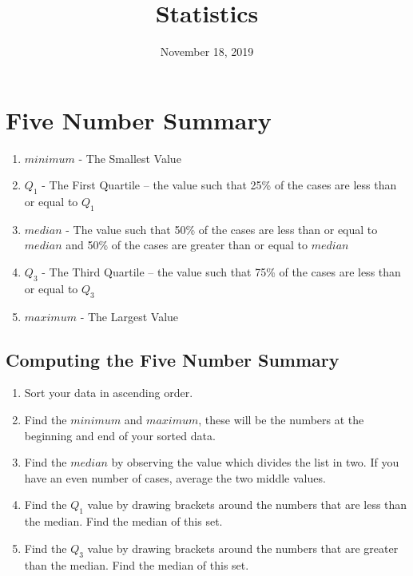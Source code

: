 \documentclass{article}
\title{Statistics}
\date{November 18, 2019}
\begin{document}
\maketitle

\section{Five Number Summary}
\begin{enumerate}
    \item $minimum$ - The Smallest Value
    \item $Q_1$ - The First Quartile -- the value such that 25\% of the cases are less than
        or equal to $Q_1$
    \item $median$ - The value such that 50\% of the cases are less
        than or equal to $median$ and 50\% of the cases are greater than
        or equal to $median$
    \item $Q_3$ - The Third Quartile -- the value such that 75\% of the cases are less than
        or equal to $Q_3$
    \item $maximum$ - The Largest Value
\end{enumerate}

\subsection{Computing the Five Number Summary}
\begin{enumerate}
    \item Sort your data in ascending order.
    \item Find the $minimum$ and $maximum$, these will be the numbers
        at the beginning and end of your sorted data.
    \item Find the $median$ by observing the value which divides the
        list in two.  If you have an even number of cases, average the
        two middle values.
    \item Find the $Q_1$ value by drawing brackets around the numbers
        that are less than the median.  Find the median of this set.
    \item Find the $Q_3$ value by drawing brackets around the numbers
        that are greater than the median. Find the median of this set.
\end{enumerate}
\end{document}

